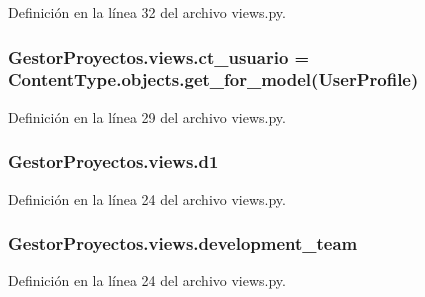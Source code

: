 Definición en la línea 32 del archivo views.\+py.

\subsubsection[{\texorpdfstring{ct\+\_\+usuario}{ct_usuario}}]{\setlength{\rightskip}{0pt plus 5cm}Gestor\+Proyectos.\+views.\+ct\+\_\+usuario = Content\+Type.\+objects.\+get\+\_\+for\+\_\+model({\bf User\+Profile})}\hypertarget{namespace_gestor_proyectos_1_1views_a14755a3f8b4bed329a33177f8ba8ccbd}{}\label{namespace_gestor_proyectos_1_1views_a14755a3f8b4bed329a33177f8ba8ccbd}


Definición en la línea 29 del archivo views.\+py.

\subsubsection[{\texorpdfstring{d1}{d1}}]{\setlength{\rightskip}{0pt plus 5cm}Gestor\+Proyectos.\+views.\+d1}\hypertarget{namespace_gestor_proyectos_1_1views_aa9cc23100ae24757e535aee968525f32}{}\label{namespace_gestor_proyectos_1_1views_aa9cc23100ae24757e535aee968525f32}


Definición en la línea 24 del archivo views.\+py.

\subsubsection[{\texorpdfstring{development\+\_\+team}{development_team}}]{\setlength{\rightskip}{0pt plus 5cm}Gestor\+Proyectos.\+views.\+development\+\_\+team}\hypertarget{namespace_gestor_proyectos_1_1views_a5afcb612c55740420069dda80959ff88}{}\label{namespace_gestor_proyectos_1_1views_a5afcb612c55740420069dda80959ff88}


Definición en la línea 24 del archivo views.\+py.

